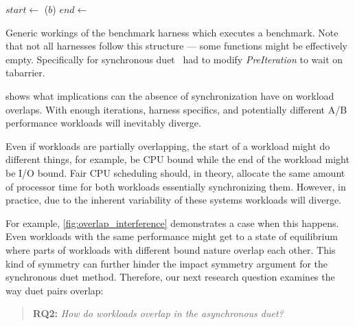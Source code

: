 \begin{algorithm}
\begin{algorithmic}
		\State {}
		 	\State {}
			\State $start \gets$ 
			\State {}($b$)
			\State $end \gets$ 
			\State {}
		\EndFor
		\State {}
		\State {}
	\EndFunction
\end{algorithmic}
\caption{
	Generic workings of the benchmark harness which executes a benchmark.
	Note that not all harnesses follow this structure --- some functions might be effectively empty.
	Specifically for synchronous duet~\citet{bulej2020duet} had to modify \emph{PreIteration} to wait on tabarrier.
}
\label{alg:harness}
\end{algorithm}

 shows what implications can the absence of synchronization have on workload overlaps.
With enough iterations, harness specifics, and potentially different A/B performance workloads will inevitably diverge.

Even if workloads are partially overlapping, the start of a workload might do different things, for example, be CPU bound while the end of the workload might be I/O bound.
Fair CPU scheduling should, in theory, allocate the same amount of processor time for both workloads essentially synchronizing them.
However, in practice, due to the inherent variability of these systems workloads will diverge.

For example, \cref{fig:overlap_interference} demonstrates a case when this happens.
Even workloads with the same performance might get to a state of equilibrium where parts of workloads with different bound nature overlap each other.
This kind of symmetry can further hinder the impact symmetry argument for the synchronous duet method.
Therefore, our next research question examines the way duet pairs overlap:

\begin{quote}
	\textbf{RQ2:} \emph{How do workloads overlap in the asynchronous duet?}
\end{quote}

